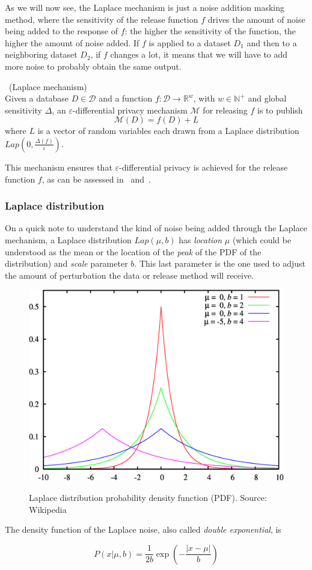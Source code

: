 As we will now see, the Laplace mechanism is just a noise addition masking method, where the sensitivity of the release function $f$ drives the amount of noise being added to the response of $f$: the higher the sensitivity of the function, the higher the amount of noise added. If $f$ is applied to a dataset $D_1$ and then to a neighboring dataset $D_2$, if $f$ changes a lot, it means that we will have to add more noise to probably obtain the same output.

\begin{definition}~(Laplace mechanism)\\
Given a database $D \in \mathcal{D}$ and a function $f : \mathcal{D} \rightarrow \mathbb{R}^w$, with $w \in \mathbb{N}^+$ and global sensitivity $\Delta$, an $\varepsilon$-differential privacy mechanism $\mathcal{M}$ for releasing $f$ is to publish
\begin{equation}
\mathcal{M}(D) = f(D) + L
\end{equation}
where $L$ is a vector of random variables each drawn from a Laplace distribution $Lap(0, \frac{\Delta(f)}{\varepsilon})$.
\end{definition}

This mechanism ensures that $\varepsilon$-differential privacy is achieved for the release function $f$, as can be assessed in~\citet{Leoni:NonInteractiveDiffPriv} and~\citet{Domingo:EnhancingDiffPrivMicroaggregation}.

\subsubsection*{Laplace distribution}

On a quick note to understand the kind of noise being added through the Laplace mechanism, a Laplace distribution $Lap(\mu, b)$ has \textit{location} $\mu$ (which could be understood as the mean or the location of the \textit{peak} of the PDF of the distribution) and \textit{scale} parameter $b$. This last parameter is the one used to adjust the amount of perturbation the data or release method will receive.

\begin{figure}[h]
	\centering
	\includegraphics[width=0.5\linewidth]{figures/laplace-pdf.png}
	\label{fig:laplace-pdf}
	\caption[Laplace distribution.]{Laplace distribution probability density function (PDF). Source: Wikipedia~\cite{web:Wiki:LaplaceDist}}
\end{figure}

The density function of the Laplace noise, also called \textit{double exponential}, is

\begin{equation}
P(x|\mu,b) = \frac{1}{2b}\exp(-\frac{|x-\mu|}{b})
\end{equation}







